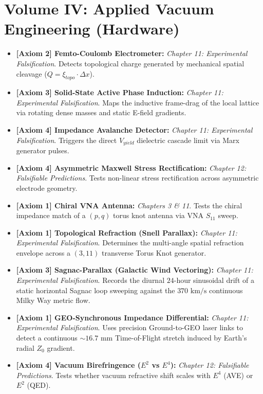 \section{Volume IV: Applied Vacuum Engineering (Hardware)}
\begin{itemize}
    \item \textbf{[Axiom 2] Femto-Coulomb Electrometer:} \textit{Chapter 11: Experimental Falsification}. Detects topological charge generated by mechanical spatial cleavage ($Q = \xi_{topo} \cdot \Delta x$).
    \item \textbf{[Axiom 3] Solid-State Active Phase Induction:} \textit{Chapter 11: Experimental Falsification}. Maps the inductive frame-drag of the local lattice via rotating dense masses and static E-field gradients.
    \item \textbf{[Axiom 4] Impedance Avalanche Detector:} \textit{Chapter 11: Experimental Falsification}. Triggers the direct $V_{yield}$ dielectric cascade limit via Marx generator pulses.
    \item \textbf{[Axiom 4] Asymmetric Maxwell Stress Rectification:} \textit{Chapter 12: Falsifiable Predictions}. Tests non-linear stress rectification across asymmetric electrode geometry.
    \item \textbf{[Axiom 1] Chiral VNA Antenna:} \textit{Chapters 3 \& 11}. Tests the chiral impedance match of a $(p,q)$ torus knot antenna via VNA $S_{11}$ sweep.
    \item \textbf{[Axiom 1] Topological Refraction (Snell Parallax):} \textit{Chapter 11: Experimental Falsification}. Determines the multi-angle spatial refraction envelope across a $(3,11)$ transverse Torus Knot generator.
    \item \textbf{[Axiom 3] Sagnac-Parallax (Galactic Wind Vectoring):} \textit{Chapter 11: Experimental Falsification}. Records the diurnal $24$-hour sinusoidal drift of a static horizontal Sagnac loop sweeping against the $370\text{ km/s}$ continuous Milky Way metric flow.
    \item \textbf{[Axiom 1] GEO-Synchronous Impedance Differential:} \textit{Chapter 11: Experimental Falsification}. Uses precision Ground-to-GEO laser links to detect a continuous $\sim 16.7\text{ mm}$ Time-of-Flight stretch induced by Earth's radial $Z_0$ gradient.
    \item \textbf{[Axiom 4] Vacuum Birefringence ($E^2$ vs $E^4$):} \textit{Chapter 12: Falsifiable Predictions}. Tests whether vacuum refractive shift scales with $E^4$ (AVE) or $E^2$ (QED). %

\end{itemize}
